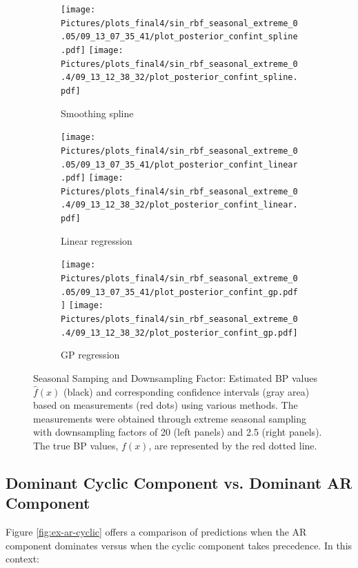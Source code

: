 \begin{figure}
\begin{subfigure}{\textwidth}
    \centering
    \texttt{[image: 
        Pictures/plots\_final4/sin\_rbf\_seasonal\_extreme\_0.05/09\_13\_07\_35\_41/plot\_posterior\_confint\_spline.pdf]}
    \texttt{[image: 
        Pictures/plots\_final4/sin\_rbf\_seasonal\_extreme\_0.4/09\_13\_12\_38\_32/plot\_posterior\_confint\_spline.pdf]}
  \caption{Smoothing spline}
\end{subfigure}

\begin{subfigure}{\textwidth}
    \centering
    \texttt{[image: 
        Pictures/plots\_final4/sin\_rbf\_seasonal\_extreme\_0.05/09\_13\_07\_35\_41/plot\_posterior\_confint\_linear.pdf]}
    \texttt{[image: 
        Pictures/plots\_final4/sin\_rbf\_seasonal\_extreme\_0.4/09\_13\_12\_38\_32/plot\_posterior\_confint\_linear.pdf]}
  \caption{Linear regression }
\end{subfigure}

\begin{subfigure}{\textwidth}
    \centering
    \texttt{[image: 
        Pictures/plots\_final4/sin\_rbf\_seasonal\_extreme\_0.05/09\_13\_07\_35\_41/plot\_posterior\_confint\_gp.pdf]}
    \texttt{[image: 
        Pictures/plots\_final4/sin\_rbf\_seasonal\_extreme\_0.4/09\_13\_12\_38\_32/plot\_posterior\_confint\_gp.pdf]}
  \caption{GP regression}
\end{subfigure}\hfill

\caption[Seasonal Samping and Downsampling Factor]{Seasonal Samping and Downsampling Factor:
    Estimated BP values $\hat{f}(x)$ (black) and corresponding confidence intervals (gray area)
    based on measurements (red dots) using various methods.
    The measurements were obtained through extreme seasonal sampling with downsampling
    factors of 20 (left panels) and 2.5 (right panels).
    The true BP values, $f(x)$, are represented by the red dotted line.}
\label{fig:ex-seasonal-sampling}
\end{figure}



\subsection{Dominant Cyclic Component vs. Dominant AR Component}\label{subsec:dominant-cyclic-component-vs.-dominant-ar-component}

Figure \ref{fig:ex-ar-cyclic} offers a comparison of predictions when
the AR component dominates versus when the cyclic component takes precedence.
In this context:

